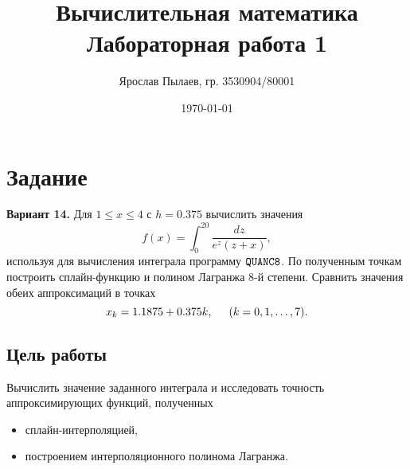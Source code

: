 \documentclass[a4paper,11pt]{article}
\title{Вычислительная математика \\ Лабораторная работа 1}
\author{Ярослав Пылаев, гр. 3530904/80001}
\date{\today}
\begin{document}
\maketitle


\newpage
\section{Задание}
\noindent \textbf{Вариант 14.} Для $1 \le x \le 4$ с $h = 0.375$ вычислить значения
      \[ f(x) = \int_0^{20} \frac{dz}{e^z(z + x)}, \]
      используя для вычисления интеграла программу $\verb|QUANC8|$.
      По полученным точкам построить сплайн-функцию и полином Лагранжа 8-й степени.
      Сравнить значения обеих аппроксимаций в точках \[ x_k = 1.1875 + 0.375k, \hspace{5mm} (k = 0, 1,\dots, 7).\]
\subsection{Цель работы}
\noindent Вычислить значение заданного интеграла и исследовать точность аппроксимирующих функций,
      полученных
\begin{itemize}
  \item сплайн-интерполяцией,
  \item построением интерполяционного полинома Лагранжа.
\end{itemize}
\end{document}
